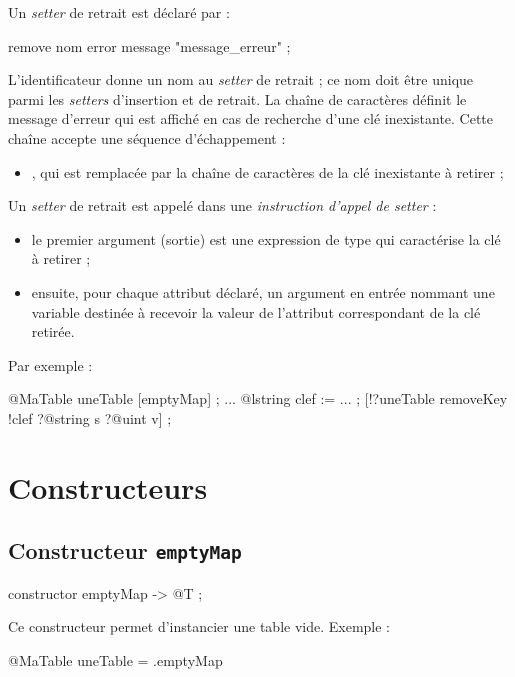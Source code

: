 Un \emph{setter} de retrait est déclaré par :

\begin{galgascode}
remove nom error message "message_erreur" ;
\end{galgascode}

L'identificateur  donne un nom au \emph{setter} de retrait ; ce nom doit être unique parmi les \emph{setters} d'insertion et de retrait. La chaîne de caractères  définit le message d'erreur qui est affiché en cas de recherche d'une clé inexistante. Cette chaîne accepte une séquence d'échappement :
\begin{itemize}
  \item {}, qui est remplacée par la chaîne de caractères de la clé inexistante à retirer ;
\end{itemize}


Un \emph{setter} de retrait est appelé dans une \emph{instruction d'appel de setter} :
\begin{itemize}
  \item le premier argument (sortie) est une expression de type  qui caractérise la clé à retirer ;
  \item ensuite, pour chaque attribut déclaré, un argument en entrée nommant une variable destinée à recevoir la valeur de l'attribut correspondant de la clé retirée.
\end{itemize}

Par exemple :
\begin{galgascode}
@MaTable uneTable [emptyMap] ;
...
@lstring clef := ... ;
[!?uneTable removeKey !clef ?@string s ?@uint v] ;
\end{galgascode}






\section{Constructeurs}

\subsection{Constructeur \texttt{emptyMap}}

\begin{galgascode}
constructor emptyMap -> @T ;
\end{galgascode}

Ce constructeur permet d'instancier une table vide. Exemple :
\begin{galgascode}
@MaTable uneTable = .emptyMap
\end{galgascode}

